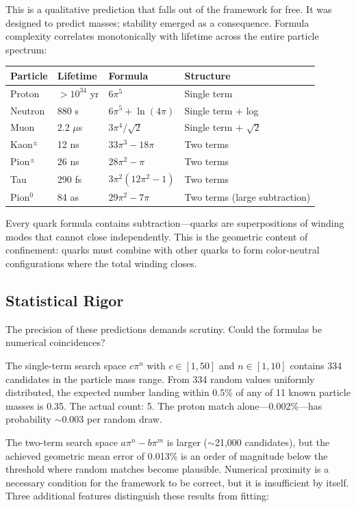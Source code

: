 \documentclass[12pt]{article}
\begin{document}
\medskip
This is a qualitative prediction that falls out of the framework for free. It was designed to predict masses; stability emerged as a consequence. Formula complexity correlates monotonically with lifetime across the entire particle spectrum:

\begin{center}
\begin{tabular}{l l l l}
\toprule
\textbf{Particle} & \textbf{Lifetime} & \textbf{Formula} & \textbf{Structure} \\
\midrule
Proton & $> 10^{34}$ yr & $6\pi^5$ & Single term \\
Neutron & 880 s & $6\pi^5 + \ln(4\pi)$ & Single term + log \\
Muon & 2.2 $\mu$s & $3\pi^4/\sqrt{2}$ & Single term + $\sqrt{2}$ \\
Kaon$^\pm$ & 12 ns & $33\pi^3 - 18\pi$ & Two terms \\
Pion$^\pm$ & 26 ns & $28\pi^2 - \pi$ & Two terms \\
Tau & 290 fs & $3\pi^2(12\pi^2 - 1)$ & Two terms \\
Pion$^0$ & 84 as & $29\pi^2 - 7\pi$ & Two terms (large subtraction) \\
\bottomrule
\end{tabular}
\end{center}

\medskip
Every quark formula contains subtraction---quarks are superpositions of winding modes that cannot close independently. This is the geometric content of confinement: quarks must combine with other quarks to form color-neutral configurations where the total winding closes.

\subsection{Statistical Rigor}

The precision of these predictions demands scrutiny. Could the formulas be numerical coincidences?

The single-term search space $c\pi^n$ with $c \in [1, 50]$ and $n \in [1, 10]$ contains 334 candidates in the particle mass range. From 334 random values uniformly distributed, the expected number landing within 0.5\% of any of 11 known particle masses is 0.35. The actual count: 5. The proton match alone---0.002\%---has probability $\sim$0.003 per random draw.

The two-term search space $a\pi^n - b\pi^m$ is larger ($\sim$21,000 candidates), but the achieved geometric mean error of 0.013\% is an order of magnitude below the threshold where random matches become plausible. Numerical proximity is a necessary condition for the framework to be correct, but it is insufficient by itself. Three additional features distinguish these results from fitting:
\end{document}
